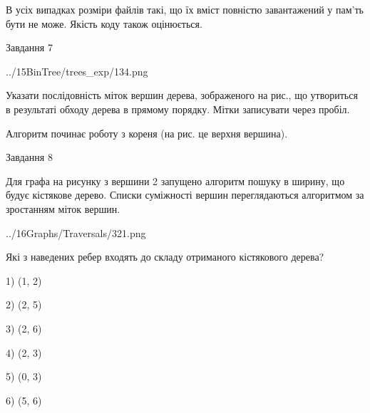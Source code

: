 \documentclass[12pt, ukrainian]{article}
\begin{document}
{В усіх випадках розміри файлів такі, що їх вміст повністю завантажений у пам'ть бути не може. Якість коду також оцінюється.



\vspace{10mm}\par

\newpage
\begin{minipage}[t]{9.7cm}
               
{\begin{center}Завдання {7}\end{center}}
\vspace{-4mm}

\begin{center}
	{../15BinTree/trees_exp/134.png}
\end{center}
Указати послідовність міток вершин дерева, зображеного на рис., що утвориться в результаті обходу дерева в прямому порядку. Мітки записувати через пробіл.\par Алгоритм починає роботу з кореня (на рис. це верхня вершина).\par

\end{minipage}
\vline \hspace{8mm}
\begin{minipage}[t]{8.0cm}
               
{\begin{center}Завдання {8}\end{center}}
\vspace{-4mm}
Для графа на рисунку з вершини 2 запущено алгоритм пошуку в ширину, що будує кістякове дерево. Списки суміжності вершин переглядаються алгоритмом за зростанням міток вершин.\par
\begin{center}
	{../16Graphs/Traversals/321.png}
\end{center}
\par Які з наведених ребер входять до складу отриманого кістякового дерева?\par
1) (1, 2)\par
2) (2, 5)\par
3) (2, 6)\par
4) (2, 3)\par
5) (0, 3)\par
6) (5, 6)\par
{\vskip 15pt} \par


\end{minipage}}
\end{document}
